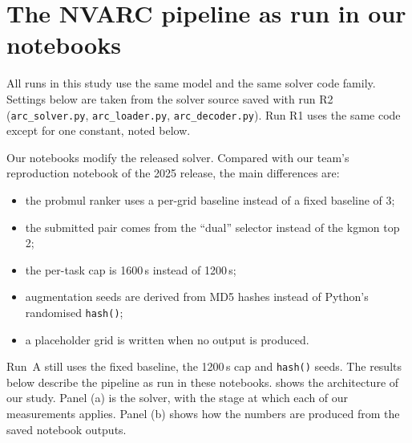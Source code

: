 \documentclass[11pt]{article}
\newcommand{\code}[1]{\texttt{#1}}
\newcommand{\R}[1]{R#1}
\begin{document}
\section{The NVARC pipeline as run in our notebooks}
\label{sec:pipeline}

All runs in this study use the same model and the same solver code family. Settings below are taken from the solver source saved with run \R{2} (\code{arc\_solver.py}, \code{arc\_loader.py}, \code{arc\_decoder.py}). Run \R{1} uses the same code except for one constant, noted below.

Our notebooks modify the released solver. Compared with our team's reproduction notebook of the 2025 release, the main differences are:
\begin{itemize}
\item the probmul ranker uses a per-grid baseline instead of a fixed baseline of 3;
\item the submitted pair comes from the ``dual'' selector instead of the kgmon top 2;
\item the per-task cap is 1600\,s instead of 1200\,s;
\item augmentation seeds are derived from MD5 hashes instead of Python's randomised \code{hash()};
\item a placeholder grid is written when no output is produced.
\end{itemize}
Run~A still uses the fixed baseline, the 1200\,s cap and \code{hash()} seeds.
The results below describe the pipeline as run in these notebooks.
 shows the architecture of our study. Panel (a) is the solver, with the stage at which each of our measurements applies. Panel (b) shows how the numbers are produced from the saved notebook outputs.
\end{document}
